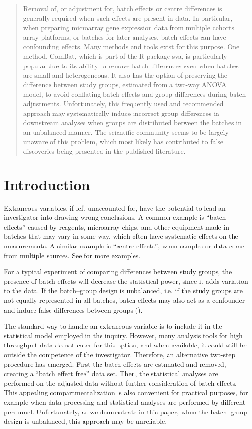 \documentclass[oupdraft]{bio}
\begin{document}
\begin{abstract}
{Removal of, or adjustment for, batch effects or centre differences is generally required when such effects are present in data. In particular, when preparing microarray gene expression data from multiple cohorts, array platforms, or batches for later analyses, batch effects can have confounding effects. Many methods and tools exist for this purpose. One method, ComBat, which is part of the R package sva, is particularly popular due to its ability to remove batch differences even when batches are small and heterogeneous. It also has the option of preserving the difference between study groups, estimated from a two-way ANOVA model, to avoid conflating batch effects and group differences during batch adjustments. Unfortunately, this frequently used and recommended approach may systematically induce incorrect group differences in downstream analyses when groups are distributed between the batches in an unbalanced manner. The scientific community seems to be largely unaware of this problem, which most likely has contributed to false discoveries being presented in the published literature.
}
\end{abstract}


\section{Introduction}\label{intro}

Extraneous variables, if left unaccounted for, have the potential to lead an investigator into drawing wrong conclusions. A common example is ``batch effects'' caused by reagents, microarray chips, and other equipment made in batches that may vary in some way, which often have systematic effects on the measurements. A similar example is ``centre effects'', when samples or data come from multiple sources. See \citet{Luo2010} for more examples.

For a typical experiment of comparing differences between study groups, the presence of batch effects will decrease the statistical power, since it adds variation to the data. If the batch--group design is unbalanced, i.e. if the study groups are not equally represented in all batches, batch effects may also act as a confounder and induce false differences between groups (\citealp{Leek2010}).

The standard way to handle an extraneous variable is to include it in the statistical model employed in the inquiry. However, many analysis tools for high throughput data do not cater for this option, and when available, it could still be outside the competence of the investigator. Therefore, an alternative two-step procedure has emerged. First the batch effects are estimated and removed, creating a ``batch effect free'' data set. Then, the statistical analyses are performed on the adjusted data without further consideration of batch effects. This appealing compartmentalization is also convenient for practical purposes, for example when data-processing and statistical analyses are performed by different personnel. Unfortunately, as we demonstrate in this paper, when the batch--group design is unbalanced, this approach may be unreliable.
\end{document}
